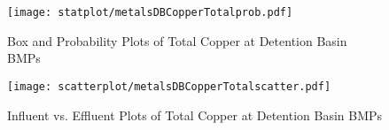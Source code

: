         \begin{figure}[hb]   %
            \centering
            \texttt{[image: statplot/metalsDBCopperTotalprob.pdf]}
            \caption{Box and Probability Plots of Total Copper at Detention Basin BMPs}
        \end{figure}         %
        
        
        \begin{figure}[hb]   %
            \centering
            \texttt{[image: scatterplot/metalsDBCopperTotalscatter.pdf]}
            \caption{Influent vs. Effluent Plots of Total Copper at Detention Basin BMPs}
        \end{figure}         %
        \clearpage
        